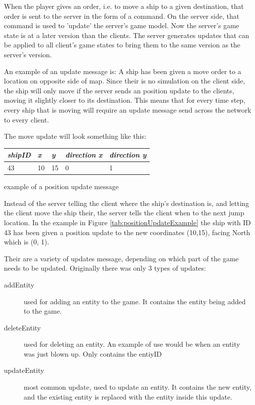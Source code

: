 When the player gives an order, i.e. to move a ship to a given destination, that order is sent to the server in the form of a command.
On the server side, that command is used to 'update' the server's game model. Now the server's game state is at a later version than the clients. The server generates updates that can be applied to all client's game states to bring them to the same version as the server's version.

An example of an update message is: A ship has been given a move order to a location on opposite side of map.
Since their is no simulation on the client side, the ship will only move if the server sends an position update to the clients, moving it slightly closer to its destination. This means that for every time step, every ship that is moving will require an update message send across the network to every client. 

The move update will look something like this:

\begin{margintable}
    \begin{tabular}{l l l l l}
    \toprule
    \emph{shipID} & \emph{x} & \emph{y} & \emph{direction x} & \emph{direction y} \\ 
    \midrule
    43 & 10 & 15 & 0 & 1 \\
    \bottomrule
    \end{tabular}
    	\vspace{1em}
	\caption{example of a position update message}
	\label{tab:positionUpdateExample}
\end{margintable}

Instead of the server telling the client where the ship's destination is, and letting the client move the ship their, the server tells the client when to the next jump location. In the example in Figure \ref{tab:positionUpdateExample} the ship with ID 43 has been given a position update to the new coordinates (10,15), facing North which is (0, 1).

Their are a variety of updates message, depending on which part of the game needs to be updated. 
Originally there was only 3 types of updates:
\begin{description}
\item[addEntity] used for adding an entity to the game. It contains the entity being added to the game.
\item[deleteEntity] used for deleting an entity. An example of use would be when an entity was just blown up. Only contains the entiyID
\item[updateEntity] most common update, used to update an entity. It contains the new entity, and the existing entity is replaced with the entity inside this update.
\end{description}


